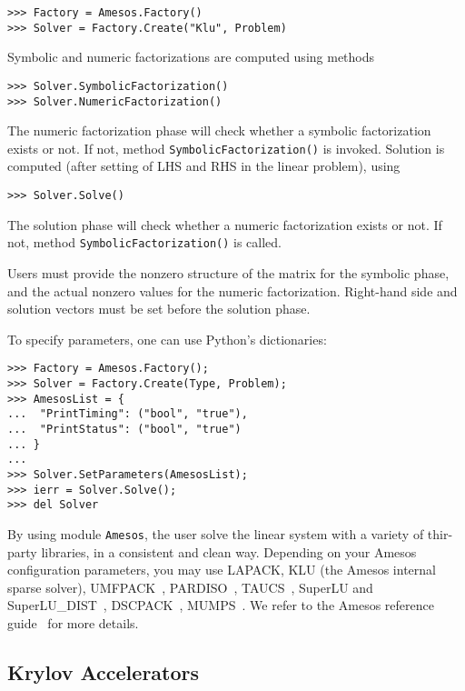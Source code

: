 \documentclass[10pt,relax]{SANDreport}
\begin{document}
\begin{verbatim}
>>> Factory = Amesos.Factory()
>>> Solver = Factory.Create("Klu", Problem)
\end{verbatim}

Symbolic and numeric factorizations are computed using methods
\begin{verbatim}
>>> Solver.SymbolicFactorization()
>>> Solver.NumericFactorization()
\end{verbatim}
The numeric factorization phase will check whether a symbolic
factorization exists or not. If not, method
\verb!SymbolicFactorization()! is invoked.  Solution is computed (after
setting of LHS and RHS in the linear problem), using
\begin{verbatim}
>>> Solver.Solve()
\end{verbatim}
The solution phase will check whether a numeric factorization exists or
not. If not, method \verb!SymbolicFactorization()! is called.

Users must provide the nonzero structure of the matrix for the symbolic
phase, and the actual nonzero values for the numeric
factorization. Right-hand side and solution vectors must be set before
the solution phase.
  
To specify parameters, one can use Python's dictionaries:
\begin{verbatim}
>>> Factory = Amesos.Factory();
>>> Solver = Factory.Create(Type, Problem);
>>> AmesosList = {
...  "PrintTiming": ("bool", "true"),
...  "PrintStatus": ("bool", "true")
... }
...
>>> Solver.SetParameters(AmesosList);
>>> ierr = Solver.Solve();
>>> del Solver
\end{verbatim}

By using module {\tt Amesos}, the user solve the linear system with a variety
of thir-party libraries, in a consistent and clean way. Depending on your
Amesos configuration parameters, you may use LAPACK, KLU 
(the Amesos internal sparse solver), UMFPACK~\cite{umfpack-manual},
  PARDISO~\cite{pardiso-manual}, TAUCS~\cite{taucs-manual},
  SuperLU and SuperLU\_DIST~\cite{superlu-manual},
  DSCPACK~\cite{dscpack-manual}, MUMPS~\cite{mumps-manual}.
  We refer to the Amesos reference guide~\cite{Amesos-Reference-Guide} for more details.

\subsection{Krylov Accelerators}
\label{sec:iterative}
\end{document}
